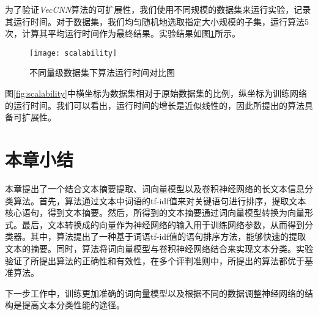 为了验证\textit{VecCNN}算法的可扩展性，我们使用不同规模的数据集来运行实验，记录其运行时间。对于数据集，我们均匀随机地选取指定大小规模的子集，运行算法5次，计算其平均运行时间作为最终结果。实验结果如图\ref{fig:scalabilityCNN}所示。

\begin{figure}[!htbp]
    \centering
    \texttt{[image: scalability]}
    \caption{不同量级数据集下算法运行时间对比图}
    \label{fig:scalabilityCNN}
\end{figure}

图\ref{fig:scalability}中横坐标为数据集相对于原始数据集的比例，纵坐标为训练网络的运行时间。我们可以看出，运行时间的增长是近似线性的，因此所提出的算法具备可扩展性。
\section{本章小结}
\label{sec3:conclusion}
本章提出了一个结合文本摘要提取、词向量模型以及卷积神经网络的长文本信息分类算法。首先，算法通过文本中词语的tf-idf值来对关键语句进行排序，提取文本核心语句，得到文本摘要。然后，所得到的文本摘要通过词向量模型转换为向量形式。最后，文本转换成的向量作为神经网络的输入用于训练网络参数，从而得到分类器。其中，算法提出了一种基于词语tf-idf值的语句排序方法，能够快速的提取文本的摘要。同时，算法将词向量模型与卷积神经网络结合来实现文本分类。实验验证了所提出算法的正确性和有效性，在多个评判准则中，所提出的算法都优于基准算法。

下一步工作中，训练更加准确的词向量模型以及根据不同的数据调整神经网络的结构是提高文本分类性能的途径。